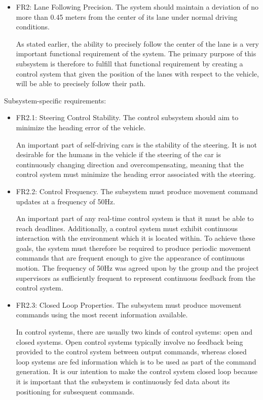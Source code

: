 \documentclass[titlepage]{article}
\begin{document}
\begin{itemize}
	\item FR2: Lane Following Precision. The system should maintain a deviation of no more than 0.45 meters from the center of its lane under normal driving conditions.
	
	As stated earlier, the ability to precisely follow the center of the lane is a very important functional requirement of the system. The primary purpose of this subsystem is therefore to fulfill that functional requirement by creating a control system that given the position of the lanes with respect to the vehicle, will be able to precisely follow their path.

\end{itemize}
Subsystem-specific requirements:
\begin{itemize}


	\item FR2.1: Steering Control Stability. The control subsystem should aim to minimize the heading error of the vehicle.
	
	An important part of self-driving cars is the stability of the steering. It is not desirable for the humans in the vehicle if the steering of the car is continuously changing direction and overcompensating, meaning that the control system must minimize the heading error associated with the steering.

	\item FR2.2: Control Frequency.
	The subsystem must produce movement command updates at a frequency of 50Hz.
	
	An important part of any real-time control system is that it must be able to reach deadlines. Additionally, a control system must exhibit continuous interaction with the environment which it is located within. To achieve these goals, the system must therefore be required to produce periodic movement commands that are frequent enough to give the appearance of continuous motion. The frequency of 50Hz was agreed upon by the group and the project supervisors as sufficiently frequent to represent continuous feedback from the control system.
	
	\item FR2.3: Closed Loop Properties.
	The subsystem must produce movement commands using the most recent information available.

	In control systems, there are usually two kinds of control systems: open and closed systems. Open control systems typically involve no feedback being provided to the control system between output commands, whereas closed loop systems are fed information which is to be used as part of the command generation. It is our intention to make the control system closed loop because it is important that the subsystem is continuously fed data about its positioning for subsequent commands. 


\end{itemize}
\end{document}
